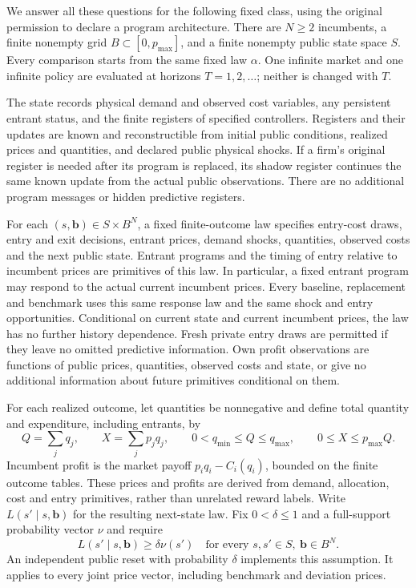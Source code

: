 \documentclass[11pt,a4paper]{article}
\begin{document}
We answer all these questions for the following fixed class, using the original
permission to declare a program architecture. There are $N\geq2$ incumbents,
a finite nonempty grid $B\subset[0,p_{\max}]$, and a finite nonempty public
state space $S$. Every comparison starts from the same fixed law $\alpha$.
One infinite market and one infinite policy are evaluated at horizons
$T=1,2,\ldots$; neither is changed with $T$.

The state records physical demand and observed cost variables, any persistent
entrant status, and the finite registers of specified controllers. Registers
and their updates are known and reconstructible from initial public conditions,
realized prices and quantities, and declared public physical shocks. If a
firm's original register is needed after its program is replaced, its shadow
register continues the same known update from the actual public observations.
There are no additional program messages or hidden predictive registers.

For each $(s,\boldsymbol b)\in S\times B^N$, a fixed finite-outcome law
specifies entry-cost draws, entry and exit decisions, entrant prices, demand
shocks, quantities, observed costs and the next public state. Entrant programs
and the timing of entry relative to incumbent prices are primitives of this
law. In particular, a fixed entrant program may respond to the actual current
incumbent prices. Every baseline, replacement and benchmark uses this same
response law and the same shock and entry opportunities. Conditional on current
state and current incumbent prices, the law has no further history dependence.
Fresh private entry draws are permitted if they leave no omitted predictive
information. Own profit observations are functions of public prices, quantities,
observed costs and state, or give no additional information about future
primitives conditional on them.

For each realized outcome, let quantities be nonnegative and define total
quantity and expenditure, including entrants, by
\[
 Q=\sum_jq_j,\qquad X=\sum_jp_jq_j,
 \qquad 0<q_{\min}\leq Q\leq q_{\max},\qquad 0\leq X\leq p_{\max}Q.
\]
Incumbent profit is the market payoff $p_iq_i-C_i(q_i)$, bounded on the finite
outcome tables. These prices and profits are derived from demand, allocation,
cost and entry primitives, rather than unrelated reward labels.
Write $L(s'\mid s,\boldsymbol b)$ for the resulting next-state law.
Fix $0<\delta\leq1$ and a full-support probability vector $\nu$ and require
\begin{equation}\label{eq:minorization}
 L(s'\mid s,\boldsymbol b)\geq\delta\nu(s')
 \quad\text{for every }s,s'\in S,\ \boldsymbol b\in B^N.
\end{equation}
An independent public reset with probability $\delta$ implements this assumption.
It applies to every joint price vector, including benchmark and deviation prices.
\end{document}
